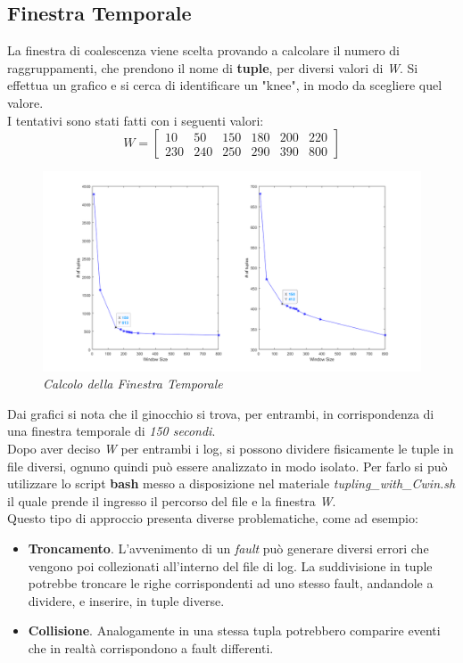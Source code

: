 \subsection{Finestra Temporale}
La finestra di coalescenza viene scelta provando a calcolare il numero di raggruppamenti, che prendono il nome di \textbf{tuple}, per diversi valori di \textit{W}. Si effettua un grafico e si cerca di identificare un "knee", in modo da scegliere quel valore.
\\I tentativi sono stati fatti con i seguenti valori:
\begin{equation*}
	W = \begin{bmatrix}
		10 & 50& 150& 180& 200& 220 \\ 230& 240& 250& 290& 390& 800
	\end{bmatrix}
\end{equation*}
\begin{figure}[H]
	\centering
	\includegraphics[width=\textwidth]{img/hw6/cwin.png}
	\caption{\textit{Calcolo della Finestra Temporale}}
\end{figure}

Dai grafici si nota che il ginocchio si trova, per entrambi, in corrispondenza di una finestra temporale di \textit{150 secondi}. 
\\Dopo aver deciso \textit{W} per entrambi i log, si possono dividere fisicamente le tuple in file diversi, ognuno quindi può essere analizzato in modo isolato. Per farlo si può utilizzare lo script \textbf{bash} messo a disposizione nel materiale \textit{tupling\_with\_Cwin.sh} il quale prende il ingresso il percorso del file e la finestra \textit{W}.
\\Questo tipo di approccio presenta diverse problematiche, come ad esempio:
\begin{itemize}
	\item \textbf{Troncamento}. L'avvenimento di un \textit{fault} può generare diversi errori che vengono poi collezionati all'interno del file di log. La suddivisione in tuple potrebbe troncare le righe corrispondenti ad uno stesso fault, andandole a dividere, e inserire, in tuple diverse. 
	\item \textbf{Collisione}. Analogamente in una stessa tupla potrebbero comparire eventi che in realtà corrispondono a fault differenti.
\end{itemize} 

